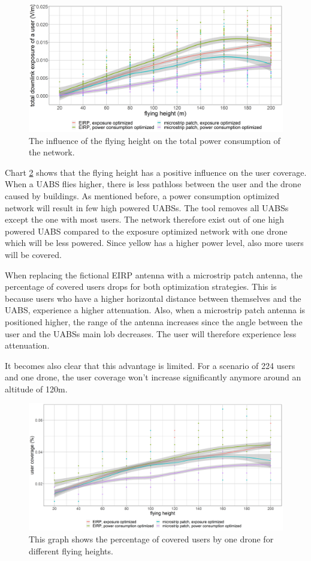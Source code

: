 \begin{figure}[h!]
  \includegraphics[width=\textwidth]{../results/s2/fhvsdl.png}
  \caption{The influence of the flying height on the total power consumption of the network.}
  \label{fig:s2fhvspc}
\end{figure}


Chart  \ref{fig:s2fhvscov} shows that the flying height has a positive influence on the user coverage. 
When a \gls{UABS} flies higher, there is less pathloss between the user and the drone caused by buildings. 
As mentioned before, a power consumption optimized network will result in few high powered \gls{UABS}s. 
The tool removes all \gls{UABS}s except the one with most users. 
The network therefore exist out of one high powered \gls{UABS} compared to the exposure optimized network with one drone which 
will be less powered. Since yellow has a higher power level, also more users will be covered.

When replacing the fictional \gls{EIRP} antenna with a microstrip patch antenna, the percentage of covered users drops for both 
optimization strategies. This is because users who have a higher horizontal distance between themselves and the \gls{UABS}, 
experience a higher attenuation. Also, when a microstrip patch antenna is positioned higher, the range of the antenna increases 
since the angle between the user and the \gls{UABS}s main lob decreases. The user will therefore experience less attenuation.

It becomes also clear that this advantage is limited. For a scenario of 224 users and one drone, the user coverage won’t increase
 significantly anymore around an altitude of 120m.

\begin{figure}[h!]
  \includegraphics[width=\textwidth]{../results/s2/fhvscov.png}
  \caption{This graph shows the percentage of covered users by one drone for different flying heights.}
  \label{fig:s2fhvscov}
\end{figure}

